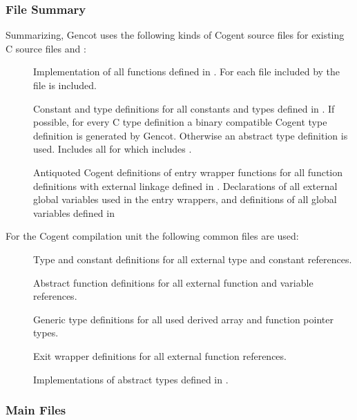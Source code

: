 \subsubsection{File Summary}

Summarizing, Gencot uses the following kinds of Cogent source files for existing C source files  and :
\begin{description}
\item[] Implementation of all functions defined in . For each file  included by
   the file  is included.
\item[] Constant and type definitions for all constants and types defined in . 
  If possible, for every C type definition a binary compatible Cogent type 
  definition is generated by Gencot. Otherwise an abstract type definition is used. Includes
  all  for which  includes .
\item[] Antiquoted Cogent definitions of entry wrapper functions for all function definitions with external linkage
  defined in . Declarations of all external global variables used in the entry wrappers, and definitions
  of all global variables defined in 
\end{description}

For the Cogent compilation unit the following common files are used:
\begin{description}
\item[] Type and constant definitions for all external type and constant references.
\item[] Abstract function definitions for all external function and variable references.
\item[] Generic type definitions for all used derived array and function pointer types.
\item[] Exit wrapper definitions for all external function references.
\item[] Implementations of abstract types defined in .
\end{description}

\subsubsection{Main Files}

